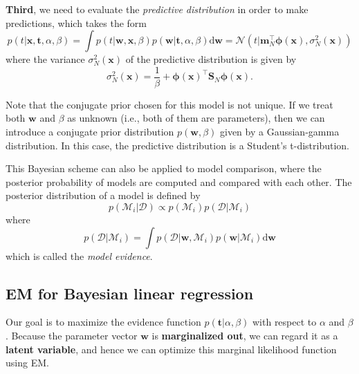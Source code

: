 \documentclass[a4paper]{report}
\newcommand{\ud}{\mathrm{d}}
\renewcommand{\bf}{\mathbf}
\renewcommand{\cal}{\mathcal}
\newcommand{\imp}[1]{{\color{blue}\textit{#1}}}
\newcommand{\bs}{\boldsymbol}
\begin{document}
\textbf{Third}, we need to evaluate the \imp{predictive distribution} in order to make predictions, which takes the form
\begin{equation}
	p(t|\bf{x,t},\alpha,\beta) = \int p(t|\bf{w,x},\beta)p(\bf{w}|\bf{t},\alpha,\beta)\ud \bf{w} = \cal{N}(t|\bf{m}_N^{\intercal} \bs{\phi}(\bf{x}),\sigma_N^2(\bf{x}))
\end{equation}
where the variance $\sigma^2_N(\bf{x})$ of the predictive distribution is given by
\begin{equation}
	\sigma_N^2(\bf{x}) = \frac{1}{\beta} + \bs{\phi}(\bf{x})^{\intercal} \bf{S}_N \bs{\phi}(\bf{x}).  \label{LRPreVar}
\end{equation}

Note that the conjugate prior chosen for this model is not unique. If we treat both $\bf{w}$ and $\beta$ as unknown (i.e., both of them are parameters), then we can introduce a conjugate prior distribution $p(\bf{w},\beta)$ given by a Gaussian-gamma distribution. In this case, the predictive distribution is a Student's t-distribution.

This Bayesian scheme can also be applied to model comparison, where the posterior probability of models are computed and compared with each other.  The posterior distribution of a model is defined by
\begin{equation}
	p(\cal{M}_i|\cal{D}) \propto p(\cal{M}_i)p(\cal{D}|\cal{M}_i)
\end{equation}
where
\begin{equation}
	p(\cal{D}|\cal{M}_i) = \int p(\cal{D}|\bf{w},\cal{M}_i)p(\bf{w}|\cal{M}_i)\ud \bf{w}
\end{equation}
which is called the \imp{model evidence}.
\subsection{EM for Bayesian linear regression}
Our goal is to maximize the evidence function $p(\bf{t}|\alpha,\beta)$ with respect to $\alpha$ and $\beta$. Because the parameter vector $\bf{w}$ is \textbf{marginalized out}, we can regard it as a \textbf{latent variable}, and hence we can optimize this marginal likelihood function using EM.
\end{document}
